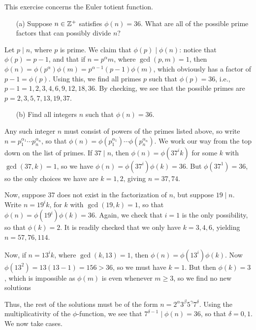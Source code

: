 \documentclass{article}
\begin{document}
\begin{exercise}
This exercise concerns the Euler totient function.
\begin{itemize}
    \item[(a)] Suppose $n\in\mathbb Z^+$ satisfies $\phi(n) = 36$. What are all of the possible prime factors that can possibly divide $n$?
\end{itemize}
\begin{solution}
Let $p\mid n$, where $p$ is prime. We claim that $\phi(p) \mid \phi(n)$: notice that $\phi(p) = p-1$, and that if $n = p^\alpha m$, where $\gcd(p, m) = 1$, then $\phi(n) = \phi(p^\alpha)\phi(m) = p^{\alpha-1}(p-1)\phi(m)$, which obviously has a factor of $p-1 = \phi(p)$. Using this, we find all primes $p$ such that $\phi(p) = 36$, i.e., $p-1 = 1,2,3,4,6,9,12,18,36$. By checking, we see that the possible primes are $p = \boxed{2, 3, 5, 7, 13, 19, 37}$.
\end{solution}
\begin{itemize}
    \item[(b)] Find all integers $n$ such that $\phi(n) = 36$.
\end{itemize}
\begin{solution}
Any such integer $n$ must consist of powers of the primes listed above, so write $n = p_1^{\alpha_1}\cdots p_n^{\alpha_n}$, so that $\phi(n) = \phi(p_1^{\alpha_1})\cdots \phi(p_n^{\alpha_n})$. We work our way from the top down on the list of primes. If $37\mid n$, then $\phi(n) = \phi(37^ik)$ for some $k$ with $\gcd(37, k) = 1$, so we have $\phi(n) = \phi(37^i)\phi(k) = 36$. But $\phi(37^1) = 36$, so the only choices we have are $k=1,2$, giving $n = \boxed{37, 74}$.

Now, suppose $37$ does not exist in the factorization of $n$, but suppose $19\mid n$. Write $n = 19^ik$, for $k$ with $\gcd(19, k) = 1$, so that $\phi(n) = \phi(19^i)\phi(k)=36$. Again, we check that $i=1$ is the only possibility, so that $\phi(k) = 2$. It is readily checked that we only have $k=3,4,6$, yielding $n = \boxed{57, 76, 114}$.

Now, if $n = 13^ik$, where $\gcd(k, 13) = 1$, then $\phi(n) = \phi(13^i)\phi(k)$. Now $\phi(13^2) = 13(13-1) = 156  > 36$, so we must have $k=1$. But then $\phi(k) = 3$, which is impossible as $\phi(m)$ is even whenever $m\geq 3$, so we find no new solutions

Thus, the rest of the solutions must be of the form $n=2^\alpha 3^\beta 5^\gamma 7^\delta$. Using the multiplicativity of the $\phi$-function, we see that $7^{\delta-1}\mid \phi(n) = 36$, so that $\delta = 0, 1$. We now take cases.


\end{solution}
\end{exercise}
\end{document}
